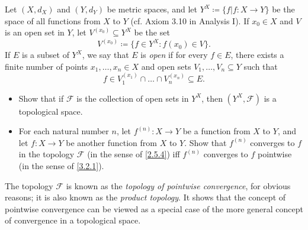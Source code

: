 \begin{ex}\label{ex:3.4.4}
  Let \((X, d_X)\) and \((Y, d_Y)\) be metric spaces, and let \(Y^X \coloneqq \{f | f : X \to Y \}\) be the space of all functions from \(X\) to \(Y\)
  (cf. Axiom 3.10 in Analysis I).
  If \(x_0 \in X\) and \(V\) is an open set in \(Y\), let \(V^{(x_0)} \subseteq Y^X\) be the set
  \[
    V^{(x_0)} \coloneqq \big\{f \in Y^X : f(x_0) \in V\big\}.
  \]
  If \(E\) is a subset of \(Y^X\), we say that \(E\) is \emph{open} if for every \(f \in E\), there exists a finite number of points \(x_1, \dots, x_n \in X\) and open sets \(V_1, \dots, V_n \subseteq Y\) such that
  \[
    f \in V_1^{(x_1)} \cap \dots \cap V_n^{(x_n)} \subseteq E.
  \]
  \begin{itemize}
    \item Show that if \(\mathcal{F}\) is the collection of open sets in \(Y^X\), then \((Y^X , \mathcal{F})\) is a topological space.
    \item For each natural number \(n\), let \(f^{(n)} : X \to Y\) be a function from \(X\) to \(Y\), and let \(f : X \to Y\) be another function from \(X\) to \(Y\).
          Show that \(f^{(n)}\) converges to \(f\) in the topology \(\mathcal{F}\) (in the sense of \cref{2.5.4}) iff \(f^{(n)}\) converges to \(f\) pointwise (in the sense of \cref{3.2.1}).
  \end{itemize}
  The topology \(\mathcal{F}\) is known as the \emph{topology of pointwise convergence}, for obvious reasons;
  it is also known as the \emph{product topology}.
  It shows that the concept of pointwise convergence can be viewed as a special case of the more general concept of convergence in a topological space.
\end{ex}

